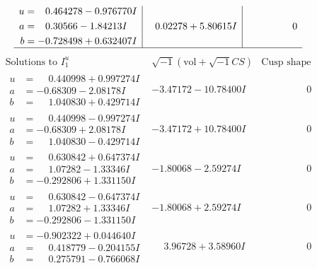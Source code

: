 \documentclass[1p]{elsarticle_modified}
\theoremstyle{definition}
\newcommand{\I}{\sqrt{-1}}
\begin{document}
$$\begin{array}{c|c|c}
\begin{aligned}
u &= \phantom{-}0.464278 - 0.976770 I \\
a &= \phantom{-}0.30566 - 1.84213 I \\
b &= -0.728498 + 0.632407 I\end{aligned}
 & \phantom{-}0.02278 + 5.80615 I & \phantom{-0.000000 } 0\\
 \hline 
 \end{array}$$\newpage$$\begin{array}{c|c|c}  
\text{Solutions to }I^u_{1}& \I (\text{vol} + \sqrt{-1}CS) & \text{Cusp shape}\\
 \hline 
\begin{aligned}
u &= \phantom{-}0.440998 + 0.997274 I \\
a &= -0.68309 - 2.08178 I \\
b &= \phantom{-}1.040830 + 0.429714 I\end{aligned}
 & -3.47172 - 10.78400 I & \phantom{-0.000000 } 0 \\ \hline\begin{aligned}
u &= \phantom{-}0.440998 - 0.997274 I \\
a &= -0.68309 + 2.08178 I \\
b &= \phantom{-}1.040830 - 0.429714 I\end{aligned}
 & -3.47172 + 10.78400 I & \phantom{-0.000000 } 0 \\ \hline\begin{aligned}
u &= \phantom{-}0.630842 + 0.647374 I \\
a &= \phantom{-}1.07282 - 1.33346 I \\
b &= -0.292806 + 1.331150 I\end{aligned}
 & -1.80068 - 2.59274 I & \phantom{-0.000000 } 0 \\ \hline\begin{aligned}
u &= \phantom{-}0.630842 - 0.647374 I \\
a &= \phantom{-}1.07282 + 1.33346 I \\
b &= -0.292806 - 1.331150 I\end{aligned}
 & -1.80068 + 2.59274 I & \phantom{-0.000000 } 0 \\ \hline\begin{aligned}
u &= -0.902322 + 0.044640 I \\
a &= \phantom{-}0.418779 - 0.204155 I \\
b &= \phantom{-}0.275791 - 0.766068 I\end{aligned}
 & \phantom{-}3.96728 + 3.58960 I & \phantom{-0.000000 } 0 \\ \hline\begin{aligned}

\end{aligned}
\end{array}$$
\end{document}

